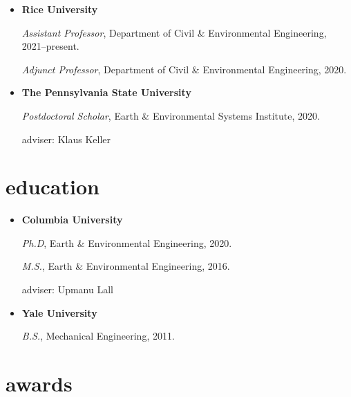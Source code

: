 \documentclass[10pt,oneside]{article}
\begin{document}
\mbox{}\vspace{-\dimexpr\baselineskip\relax}

\begin{itemize}[label={}]

  \item \textbf{Rice University}

        \textit{Assistant Professor}, Department of Civil \& Environmental Engineering, 2021--present.


        \textit{Adjunct Professor}, Department of Civil \& Environmental Engineering, 2020.



  \item \textbf{The Pennsylvania State University}

        \textit{Postdoctoral Scholar}, Earth \& Environmental Systems Institute, 2020.

        adviser: Klaus Keller



\end{itemize}


\section{education}

\mbox{}\vspace{-\dimexpr\baselineskip\relax}

\begin{itemize}[label={}]

  \item \textbf{Columbia University}

        \textit{Ph.D}, Earth \& Environmental Engineering, 2020.

        \textit{M.S.}, Earth \& Environmental Engineering, 2016.


        adviser: Upmanu Lall


  \item \textbf{Yale University}

        \textit{B.S.}, Mechanical Engineering, 2011.



\end{itemize}


\section{awards}
\end{document}

